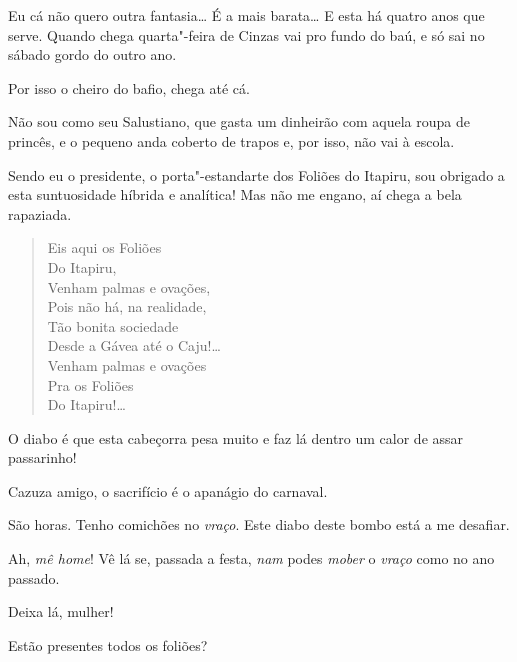  Eu cá não quero outra fantasia\ldots{} É a mais barata\ldots{} E
esta há quatro anos que serve. Quando chega quarta"-feira de Cinzas vai pro fundo
do baú, e só sai no sábado gordo do outro ano.

 Por isso o cheiro do bafio, chega até cá.

 Não sou como seu Salustiano, que gasta um dinheirão com
aquela roupa de princês, e o pequeno anda coberto de trapos e, por isso, não vai
à escola. 

 Sendo eu o presidente, o porta"-estandarte dos
Foliões do Itapiru, sou obrigado a esta suntuosidade híbrida e
analítica! Mas não me engano, aí chega a bela rapaziada.


\begin{verse}
Eis aqui os Foliões\\
\quad Do Itapiru,\\
Venham palmas e ovações,\\
Pois não há, na realidade,\\
Tão bonita sociedade\\
Desde a Gávea até o Caju!\ldots{}\\
Venham palmas e ovações\\
\quad Pra os Foliões\\
\quad Do Itapiru!\ldots{}
\end{verse}

  O diabo é que esta cabeçorra
pesa muito e faz lá dentro um calor de assar passarinho!

 Cazuza amigo, o sacrifício é o apanágio do carnaval.

 São horas. Tenho comichões no \textit{vraço}.  Este diabo deste bombo está a
me desafiar.

 Ah, \textit{mê home}! Vê lá se, passada a festa,
\textit{nam} podes \textit{mober} o \textit{vraço} como no ano passado.

 Deixa lá, mulher!

 Estão presentes todos os foliões?

